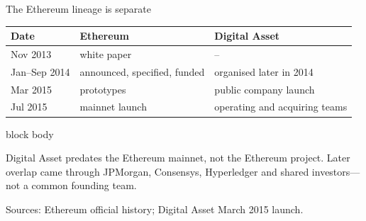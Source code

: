 \documentclass[aspectratio=169,12pt]{beamer}
\newcommand{\source}[1]{\vfill\par\fontsize{5.4}{6.5}\selectfont\color{Quiet}Sources: #1}
\newenvironment{statement}{%
  \begin{beamercolorbox}[sep=.18cm,rounded=false,wd=\linewidth]{block body}%
  \fontsize{13}{15.5}\selectfont\bfseries
}{\end{beamercolorbox}}
\begin{document}
\begin{frame}{The Ethereum lineage is separate}
  \fontsize{9.8}{11.8}\selectfont
  \begin{tabularx}{\textwidth}{L{2.15cm}Y Y}
    \toprule
    \textbf{Date} & \textbf{Ethereum} & \textbf{Digital Asset} \\
    \midrule
    Nov 2013 & white paper & -- \\
    Jan--Sep 2014 & announced, specified, funded & organised later in 2014 \\
    Mar 2015 & prototypes & public company launch \\
    Jul 2015 & mainnet launch & operating and acquiring teams \\
    \bottomrule
  \end{tabularx}
  \begin{statement}
    Digital Asset predates the Ethereum mainnet, not the Ethereum project. Later overlap came through JPMorgan, Consensys, Hyperledger and shared investors---not a common founding team.
  \end{statement}
  \source{Ethereum official history; Digital Asset March 2015 launch.}
\end{frame}
\end{document}
